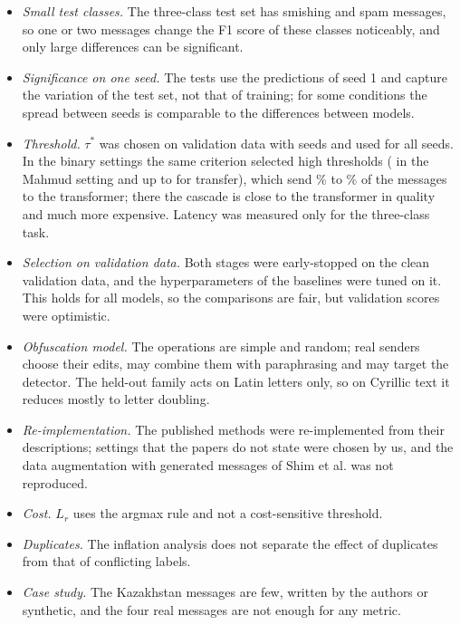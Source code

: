 \begin{itemize}
\item \emph{Small test classes.} The three-class test set has  smishing and  spam messages, so one or two messages change the F1 score of these classes noticeably, and only large differences can be significant.
\item \emph{Significance on one seed.} The tests use the predictions of seed 1 and capture the variation of the test set, not that of training; for some conditions the spread between seeds is comparable to the differences between models.
\item \emph{Threshold.} $\tau^{*}$ was chosen on validation data with seeds  and used for all seeds. In the binary settings the same criterion selected high thresholds ( in the Mahmud setting and up to  for transfer), which send \% to \% of the messages to the transformer; there the cascade is close to the transformer in quality and much more expensive. Latency was measured only for the three-class task.
\item \emph{Selection on validation data.} Both stages were early-stopped on the clean validation data, and the hyperparameters of the baselines were tuned on it. This holds for all models, so the comparisons are fair, but validation scores were optimistic.
\item \emph{Obfuscation model.} The operations are simple and random; real senders choose their edits, may combine them with paraphrasing and may target the detector. The held-out family acts on Latin letters only, so on Cyrillic text it reduces mostly to letter doubling.
\item \emph{Re-implementation.} The published methods were re-implemented from their descriptions; settings that the papers do not state were chosen by us, and the data augmentation with generated messages of Shim et al. was not reproduced.
\item \emph{Cost.} $L_r$ uses the argmax rule and not a cost-sensitive threshold.
\item \emph{Duplicates.} The inflation analysis does not separate the effect of duplicates from that of conflicting labels.
\item \emph{Case study.} The Kazakhstan messages are few, written by the authors or synthetic, and the four real messages are not enough for any metric.
\end{itemize}
